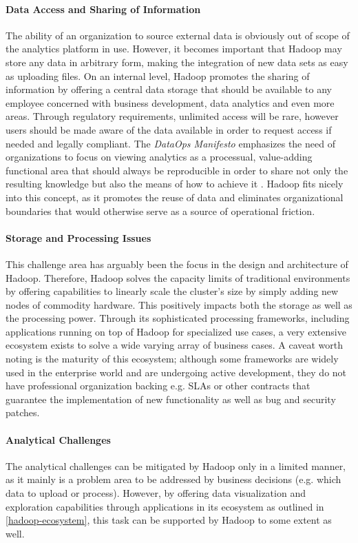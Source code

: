 \paragraph{Data Access and Sharing of Information}
The ability of an organization to source external data is obviously out of scope of the analytics platform in use. However, it becomes important that Hadoop may store any data in arbitrary form, making the integration of new data sets as easy as uploading files. On an internal level, Hadoop promotes the sharing of information by offering a central data storage that should be available to any employee concerned with business development, data analytics and even more areas. Through regulatory requirements, unlimited access will be rare, however users should be made aware of the data available in order to request access if needed and legally compliant. The \emph{DataOps Manifesto} emphasizes the need of organizations to focus on viewing analytics as a processual, value-adding functional area that should always be reproducible in order to share not only the resulting knowledge but also the means of how to achieve it \autocite[][§11, §14, §17]{dataopsmanifesto}. Hadoop fits nicely into this concept, as it promotes the reuse of data and eliminates organizational boundaries that would otherwise serve as a source of operational friction.

\paragraph{Storage and Processing Issues}
This challenge area has arguably been the focus in the design and architecture of Hadoop. Therefore, Hadoop solves the capacity limits of traditional environments by offering capabilities to linearly scale the cluster's size by simply adding new nodes of commodity hardware. This positively impacts both the storage as well as the processing power. Through its sophisticated processing frameworks, including applications running on top of Hadoop for specialized use cases, a very extensive ecosystem exists to solve a wide varying array of business cases. A caveat worth noting is the maturity of this ecosystem; although some frameworks are widely used in the enterprise world and are undergoing active development, they do not have professional organization backing e.g. \acp{SLA} or other contracts that guarantee the implementation of new functionality as well as bug and security patches.

\paragraph{Analytical Challenges}
The analytical challenges can be mitigated by Hadoop only in a limited manner, as it mainly is a problem area to be addressed by business decisions (e.g. which data to upload or process). However, by offering data visualization and exploration capabilities through applications in its ecosystem as outlined in \vref{hadoop-ecosystem}, this task can be supported by Hadoop to some extent as well.

